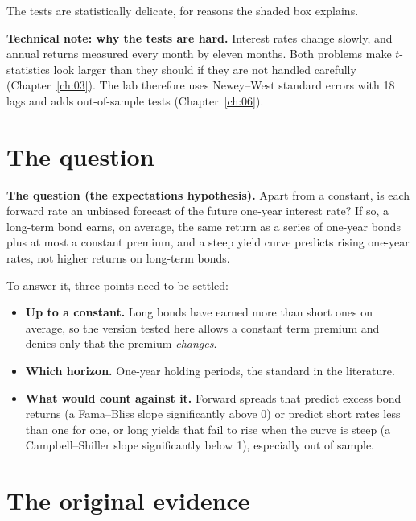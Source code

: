 The tests are statistically delicate, for reasons the shaded box explains.

\begin{technote}
\textbf{Technical note: why the tests are hard.} Interest rates change slowly, and annual returns measured every month  by eleven months. Both problems make $t$-statistics look larger than they should if they are not handled carefully (Chapter~\ref{ch:03}). The lab therefore uses Newey--West standard errors with 18 lags and adds out-of-sample tests (Chapter~\ref{ch:06}).
\end{technote}


\section{The question}
\label{sec:07-claim}

\begin{callout}
\textbf{The question (the expectations hypothesis).} Apart from a constant, is each forward rate an unbiased forecast of the future one-year interest rate? If so, a long-term bond earns, on average, the same return as a series of one-year bonds plus at most a constant premium, and a steep yield curve predicts rising one-year rates, not higher returns on long-term bonds.
\end{callout}

To answer it, three points need to be settled:

\begin{itemize}
  \item \textbf{Up to a constant.} Long bonds have earned more than short ones on average, so the version tested here allows a constant term premium and denies only that the premium \emph{changes}.
  \item \textbf{Which horizon.} One-year holding periods, the standard in the literature.
  \item \textbf{What would count against it.} Forward spreads that predict excess bond returns (a Fama--Bliss slope significantly above 0) or predict short rates less than one for one, or long yields that fail to rise when the curve is steep (a Campbell--Shiller slope significantly below 1), especially out of sample.
\end{itemize}

\section{The original evidence}
\label{sec:07-evidence}

